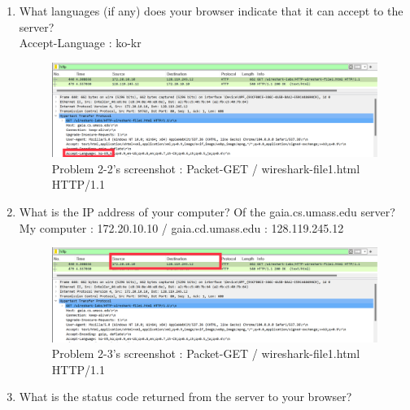 \begin{enumerate}[label=\bfseries Problem \arabic*:,leftmargin=*,labelindent=1em]
            
            
        \item What languages (if any) does your browser indicate that it can accept to the server?\\[0.2mm]
            \soln Accept-Language : ko-kr
            \vspace{-2mm}  
            \begin{figure}[!h]\centering
            \hspace{10mm} 
        		\includegraphics[width=.78\textwidth]{image/result_week01/Q2-2.png}
        		\caption{\footnotesize Problem 2-2's screenshot : Packet-GET / wireshark-file1.html HTTP/1.1}
        		\vspace{-10pt}
            \end{figure}
        \item What is the IP address of your computer? Of the gaia.cs.umass.edu server? \\[0.2mm]
            \soln My computer : 172.20.10.10 / gaia.cd.umass.edu : 128.119.245.12
            \vspace{-2mm}  
            \begin{figure}[!h]\centering
            \hspace{10mm} 
        		\includegraphics[width=.78\textwidth]{image/result_week01/Q2-3.png}
        		\caption{\footnotesize Problem 2-3's screenshot : Packet-GET / wireshark-file1.html HTTP/1.1}
        		\vspace{-10pt}
            \end{figure}
\newpage
        \item What is the status code returned from the server to your browser?\\[0.2mm]

\end{enumerate}
